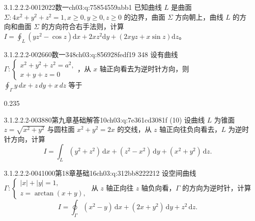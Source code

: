 \par\addvspace{2.4ex}\noindent
\begin{minipage}{\linewidth}

\begin{q}{3.1.2.2.2-001}{2022数一}{ch03:q:75854559abb1}
已知曲线 $L$ 是曲面 $\Sigma:4x^2+y^2+z^2=1,x\geqslant 0,y\geqslant 0,z\geqslant 0$ 的边界，曲面 $\Sigma$ 方向朝上，曲线 $L$ 的方向和曲面 $\Sigma$ 的方向符合右手法则，计算 $\displaystyle I=\oint_L (yz^2-\cos z)\mathrm{d}x+2xz^2\mathrm{d}y+(2xyz+x\sin z)\mathrm{d}z$。
\end{q}
\end{minipage}


\begin{q}{3.1.2.2.2-002}{660数一348}{ch03:q:856928fedf19}
348 设有曲线 $\Gamma:\begin{cases}x^2+y^2+z^2=a^2,\\x+y+z=0\end{cases}$，从 $x$ 轴正向看去为逆时针方向，则 $\displaystyle \oint_{\Gamma} y\,dx+z\,dy+x\,dz$ 等于
\begin{opts}{0.235}
\hfill{}\hfill{}\hfill{}
\end{opts}
\end{q}

\begin{q}{3.1.2.2.2-003}{880第九章基础解答10}{ch03:q:7e361cd3081f}
(10) 设曲线 $L$ 为锥面 $z=\sqrt{x^2+y^2}$ 与圆柱面 $x^2+y^2=2x$ 的交线，从 $z$ 轴正向往负向看去，$L$ 为逆时针方向，计算
\[
I=\int_L (y^2+z^2)\,\mathrm{d}x+(z^2-x^2)\,\mathrm{d}y+(x^2+y^2)\,\mathrm{d}z.
\]
\end{q}

\begin{q}{3.1.2.2.2-004}{1000第18章基础16}{ch03:q:312bb8222212}
设空间曲线 $\Gamma:\begin{cases}|x|+|y|=1,\\ z=\arctan(x+y),\end{cases}$ 从 $z$ 轴正向往 $z$ 轴负向看，$\Gamma$ 的方向为逆时针，计算
\[ I=\oint_{\Gamma}(x^2-y)\,\mathrm{d}x+(2x+y^2)\,\mathrm{d}y+z^2\,\mathrm{d}z. \]
\end{q}

